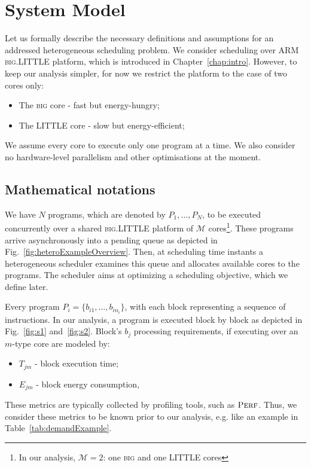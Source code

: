 \chapter{System Model}
\label{chap:systemModel}

Let us formally describe the necessary definitions and assumptions for an addressed heterogeneous scheduling problem. We consider scheduling over ARM \textsf{\textsc{big}}.\textsf{LITTLE} platform, which is introduced in Chapter~\ref{chap:intro}. However, to keep our analysis simpler, for now we restrict the platform to the case of two cores only:
%
\begin{itemize}
\item The \textsf{\textsc{big}} core \-- fast but energy-hungry;
\item The \textsf{LITTLE} core \-- slow but energy-efficient;
\end{itemize}
%
We assume every core to execute only one program at a time. We also consider no hardware-level parallelism and other optimisations at the moment.

\section{Mathematical notations}

We have $N$ programs, which are denoted by $P_1,\ldots,P_N$, to be executed concurrently over a shared \textsf{\textsc{big}}.\textsf{LITTLE} platform of $\mathcal{M}$ cores\footnote{In our analysis, $\mathcal{M}=2$: one \textsf{\textsc{big}} and one \textsf{LITTLE} cores}. These programs arrive asynchronously into a pending queue as depicted in Fig.~\ref{fig:heteroExampleOverview}. Then, at scheduling time instants a heterogeneous scheduler examines this queue and allocates available cores to the programs. The scheduler aims at optimizing a scheduling objective, which we define later. 

Every program $P_i=\{b_{i1},\ldots,b_{in_i}\}$, with each block representing a sequence of instructions. In our analysis, a program is executed block by block as depicted in Fig.~\ref{fig:s1} and~\ref{fig:s2}.
%
Block's $b_j$ processing requirements, if executing over an $m$-type core are modeled by:
%
\begin{itemize}
\item $T_{jm}$ \-- block execution time;
\smallskip
\item $E_{jm}$ \-- block energy consumption,
\end{itemize}
%
These metrics are typically collected by profiling tools, such as $\textsc{Perf}$. Thus, we consider these metrics to be known prior to our analysis, e.g. like an example in Table~\ref{tab:demandExample}.


